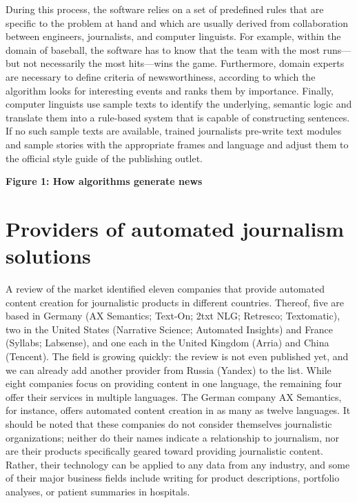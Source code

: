 \documentclass[notoc, symmetric, nobib, nols]{towcenter-book}
\begin{document}
During this process, the software relies on a set of predefined rules that are specific to the problem at hand and which are usually derived from collaboration between engineers, journalists, and computer linguists. For example, within the domain of baseball, the software has to know that the team with the most runs---but not necessarily the most hits---wins the game. Furthermore, domain experts are necessary to define criteria of newsworthiness, according to which the algorithm looks for interesting events and ranks them by importance. Finally, computer linguists use sample texts to identify the underlying, semantic logic and translate them into a rule-based system that is capable of constructing sentences. If no such sample texts are available, trained journalists pre-write text modules and sample stories with the appropriate frames and language and adjust them to the official style guide of the publishing outlet.
 
\textbf{Figure 1: How algorithms generate news}

\section{Providers of automated journalism solutions}

A review of the market identified eleven companies that provide automated content creation for journalistic products in different countries.\cite{doerr15} Thereof, five are based in Germany (AX Semantics; Text-On; 2txt NLG; Retresco; Textomatic), two in the United States (Narrative Science; Automated Insights) and France (Syllabs; Labsense), and one each in the United Kingdom (Arria) and China (Tencent). The field is growing quickly: the review is not even published yet, and we can already add another provider from Russia (Yandex) to the list. While eight companies focus on providing content in one language, the remaining four offer their services in multiple languages. The German company AX Semantics, for instance, offers automated content creation in as many as twelve languages. It should be noted that these companies do not consider themselves journalistic organizations; neither do their names indicate a relationship to journalism, nor are their products specifically geared toward providing journalistic content. Rather, their technology can be applied to any data from any industry, and some of their major business fields include writing for product descriptions, portfolio analyses, or patient summaries in hospitals. 
\end{document}
